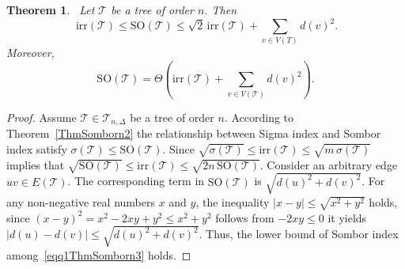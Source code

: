 \documentclass[10pt,a4paper]{amsart}
\newtheorem{theorem}{Theorem}
\newcommand{\SO}{\mathrm{SO}}
\newcommand{\TT}{\mathcal{T}}
\newcommand{\irr}{\mathrm{irr}}
\begin{document}
\begin{theorem}~\label{ThmSomborn3}
Let $\TT$ be a tree of order $n$. Then
\begin{equation}~\label{eqq1ThmSomborn3}
\irr(\TT)\leqslant \SO(\TT)\leqslant\sqrt{2}\,\irr(\TT)+\sum_{v \in V(T)} d(v)^2.
\end{equation}
Moreover,
\[
\SO(\TT)=\Theta\!\left(\irr(\TT)+\sum_{v\in V(\TT)} d(v)^2\right).
\]
\end{theorem}

\begin{proof}
Assume $\TT\in \mathcal{T}_{n,\Delta}$ be a tree of order $n$. According to Theorem~\ref{ThmSomborn2} the relationship between Sigma index and Sombor index satisfy $\sigma(\TT)\leqslant \SO(\TT)$. Since $\sqrt{\sigma(\TT)}\leqslant \irr(\TT)\leqslant \sqrt{m\,\sigma(\TT)}$ implies that $\sqrt{\SO(\TT)}\leqslant \irr(\TT)\leqslant \sqrt{2n\,\SO(\TT)}$. Consider an arbitrary edge $uv \in E(\TT)$. The corresponding term in $\SO(\TT)$ is $\sqrt{d(u)^2+d(v)^2}$. For any non-negative real numbers $x$ and $y$, the inequality $|x-y|\leqslant \sqrt{x^2+y^2}$ holds, since $(x-y)^2=x^2-2xy+y^2\leqslant x^2+y^2$ follows from $-2xy\leqslant 0$ it yields $|d(u)-d(v)|\leqslant \sqrt{d(u)^2+d(v)^2}$. Thus, the lower bound of Sombor index among~\eqref{eqq1ThmSomborn3} holds.


\end{proof}
\end{document}
